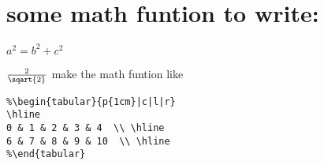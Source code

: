 \documentclass{article}
\begin{document}
\section{some math funtion to write:}
$ a^2 = b^2 + c^2 $

$ \frac{2}{\sqart{2}} $
make the math funtion like
\begin{verbatim}
%\begin{tabular}{p{1cm}|c|l|r}
\hline
0 & 1 & 2 & 3 & 4  \\ \hline
6 & 7 & 8 & 9 & 10  \\ \hline
%\end{tabular}
\end{verbatim}
%
\end{document}

